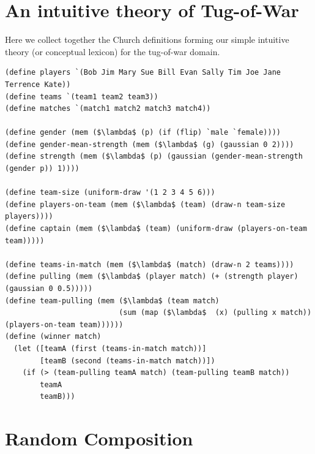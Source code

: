 \documentclass[pdfextras]{handbook}
\begin{document}
\section{An intuitive theory of Tug-of-War}
\label{tow}
Here we collect together the Church definitions forming our simple intuitive theory (or conceptual lexicon) for the tug-of-war domain.
 \begin{lstlisting}[mathescape]
(define players `(Bob Jim Mary Sue Bill Evan Sally Tim Joe Jane Terrence Kate))
(define teams `(team1 team2 team3))
(define matches `(match1 match2 match3 match4))

(define gender (mem ($\lambda$ (p) (if (flip) `male `female))))
(define gender-mean-strength (mem ($\lambda$ (g) (gaussian 0 2))))
(define strength (mem ($\lambda$ (p) (gaussian (gender-mean-strength (gender p)) 1))))

(define team-size (uniform-draw '(1 2 3 4 5 6)))
(define players-on-team (mem ($\lambda$ (team) (draw-n team-size players))))
(define captain (mem ($\lambda$ (team) (uniform-draw (players-on-team team)))))

(define teams-in-match (mem ($\lambda$ (match) (draw-n 2 teams))))
(define pulling (mem ($\lambda$ (player match) (+ (strength player) (gaussian 0 0.5)))))
(define team-pulling (mem ($\lambda$ (team match) 
                          (sum (map ($\lambda$  (x) (pulling x match)) (players-on-team team))))))
(define (winner match) 
  (let ([teamA (first (teams-in-match match))]
        [teamB (second (teams-in-match match))])
    (if (> (team-pulling teamA match) (team-pulling teamB match))
        teamA
        teamB)))
\end{lstlisting}


\section{Random Composition}
\label{composition}

\end{document}
